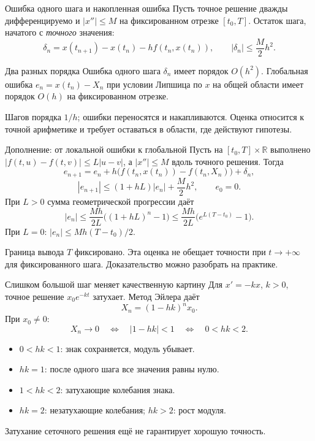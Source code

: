 \documentclass[aspectratio=169,11pt]{beamer}
\newcommand{\R}{\mathbb R}
\begin{document}
\begin{frame}{Ошибка одного шага и накопленная ошибка}
Пусть точное решение дважды дифференцируемо и $|x''|\le M$
на фиксированном отрезке $[t_0,T]$.
Остаток шага, начатого с \emph{точного} значения:
\[
\delta_n=x(t_{n+1})-x(t_n)-h f(t_n,x(t_n)),\qquad
|\delta_n|\le\frac{M}{2}h^2.
\]
\begin{block}{Два разных порядка}
Ошибка одного шага $\delta_n$ имеет порядок $O(h^2)$.
Глобальная ошибка $e_n=x(t_n)-X_n$ при условии Липшица по $x$
на общей области имеет порядок $O(h)$ на фиксированном отрезке.
\end{block}
Шагов порядка $1/h$; ошибки переносятся и накапливаются.
Оценка относится к точной арифметике и требует оставаться в области,
где действуют гипотезы.
\end{frame}

\begin{frame}{Дополнение: от локальной ошибки к глобальной}
\small
Пусть на $[t_0,T]\times\R$ выполнено
$|f(t,u)-f(t,v)|\le L|u-v|$, а $|x''|\le M$ вдоль точного решения.
Тогда
\[
e_{n+1}=e_n+h\bigl(f(t_n,x(t_n))-f(t_n,X_n)\bigr)+\delta_n,
\]
\[
|e_{n+1}|\le(1+hL)|e_n|+\frac M2h^2,\qquad e_0=0.
\]
При $L>0$ сумма геометрической прогрессии даёт
\[
|e_n|\le\frac{Mh}{2L}\bigl((1+hL)^n-1\bigr)
\le\boxed{\frac{Mh}{2L}\bigl(e^{L(T-t_0)}-1\bigr)}.
\]
При $L=0$: $|e_n|\le Mh(T-t_0)/2$.
\begin{alertblock}{Граница вывода}
$T$ фиксировано. Эта оценка не обещает точности при $t\to+\infty$
для фиксированного шага. Доказательство можно разобрать на практике.
\end{alertblock}
\end{frame}

\begin{frame}{Слишком большой шаг меняет качественную картину}
Для $x'=-kx$, $k>0$, точное решение $x_0e^{-kt}$ затухает.
Метод Эйлера даёт
\[
X_n=(1-hk)^n x_0.
\]
При $x_0\ne0$:
\[
\boxed{X_n\to0\quad\Longleftrightarrow\quad |1-hk|<1
\quad\Longleftrightarrow\quad 0<hk<2}.
\]
\begin{itemize}
\item $0<hk<1$: знак сохраняется, модуль убывает.
\item $hk=1$: после одного шага все значения равны нулю.
\item $1<hk<2$: затухающие колебания знака.
\item $hk=2$: незатухающие колебания; $hk>2$: рост модуля.
\end{itemize}
\alert{Затухание сеточного решения ещё не гарантирует хорошую точность.}
\end{frame}
\end{document}
